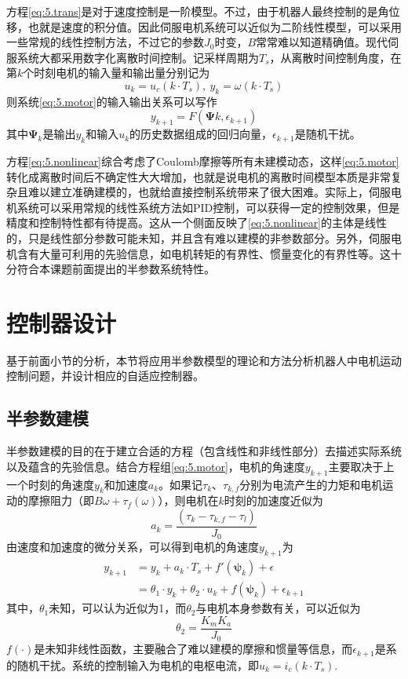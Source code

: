 方程\eqref{eq:5.trans}是对于速度控制是一阶模型。不过，由于机器人最终控制的是角位移，也就是速度的积分值。因此伺服电机系统可以近似为二阶线性模型，可以采用一些常规的线性控制方法，不过它的参数$J_{0}$时变，$B$常常难以知道精确值。现代伺服系统大都采用数字化离散时间控制。记采样周期为$T_{s}$，从离散时间控制角度，在第$k$个时刻电机的输入量和输出量分别记为
$$u_{k}=u_{c}(k\cdot T_{s}),\ y_{k}=\omega(k\cdot T_{s})$$
则系统\eqref{eq:5.motor}的输入输出关系可以写作
\begin{equation}\label{eq:5.nonlinear}
y_{k+1}=F(\bm{\Psi}{k},\epsilon_{k+1})
\end{equation}
其中$\bm{\Psi}_{k}$是输出$y_{k}$和输入$u_{k}$的历史数据组成的回归向量，$\epsilon_{k+1}$是随机干扰。

方程\eqref{eq:5.nonlinear}综合考虑了Coulomb摩擦等所有未建模动态，这样\eqref{eq:5.motor}转化成离散时间后不确定性大大增加，也就是说电机的离散时间模型本质是非常复杂且难以建立准确建模的，也就给直接控制系统带来了很大困难。实际上，伺服电机系统可以采用常规的线性系统方法如PID控制，可以获得一定的控制效果，但是精度和控制特性都有待提高。这从一个侧面反映了\eqref{eq:5.nonlinear}的主体是线性的，只是线性部分参数可能未知，并且含有难以建模的非参数部分。另外，伺服电机含有大量可利用的先验信息，如电机转矩的有界性、惯量变化的有界性等。这十分符合本课题前面提出的半参数系统特性。

\section{控制器设计}\label{chap:5.2}
基于前面小节的分析，本节将应用半参数模型的理论和方法分析机器人中电机运动控制问题，并设计相应的自适应控制器。
\subsection{半参数建模}\label{5.2.1}
半参数建模的目的在于建立合适的方程（包含线性和非线性部分）去描述实际系统以及蕴含的先验信息。结合方程组\eqref{eq:5.motor}，电机的角速度$y_{k+1}$主要取决于上一个时刻的角速度$y_{k}$和加速度$a_{k}$。如果记$\tau_{k}$、$\tau_{k,f}$分别为电流产生的力矩和电机运动的摩擦阻力（即$B \omega + \tau_{f}(\omega)$），则电机在$k$时刻的加速度近似为
$$a_{k}=\frac{(\tau_{k}-\tau_{k,f}-\tau_{l})}{J_{0}}$$
由速度和加速度的微分关系，可以得到电机的角速度$y_{k+1}$为
\begin{equation}\label{eq:5.yk1}
\begin{split}
y_{k+1}&=y_{k}+a_{k}\cdot T_{s}+f'(\bm{\psi}_{k})+\epsilon\\
&=\theta_{1}\cdot y_{k}+\theta_{2}\cdot u_{k}+f(\bm{\psi}_{k})+\epsilon_{k+1}
\end{split}
\end{equation}
其中，$\theta_{1}$未知，可以认为近似为1，而$\theta_{2}$与电机本身参数有关，可以近似为
$$\theta_{2}=\frac{K_{m}K_{a}}{J_{0}}$$
$f(\cdot)$是未知非线性函数，主要融合了难以建模的摩擦和惯量等信息，而$\epsilon_{k+1}$是系的随机干扰。系统的控制输入为电机的电枢电流，即$u_{k}=i_{c}(k\cdot T_{s})$.

